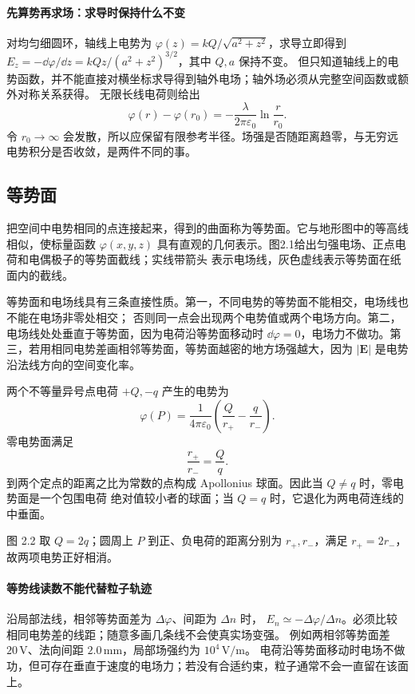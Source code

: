 \paragraph{先算势再求场：求导时保持什么不变}
对均匀细圆环，轴线上电势为 $\varphi(z)=kQ/\sqrt{a^2+z^2}$，求导立即得到
$E_z=-\dd\varphi/\dd z=kQz/(a^2+z^2)^{3/2}$，其中 $Q,a$ 保持不变。
但只知道轴线上的电势函数，并不能直接对横坐标求导得到轴外电场；轴外场必须从完整空间函数或额外对称关系获得。
无限长线电荷则给出
\[
 \varphi(r)-\varphi(r_0)=-\frac{\lambda}{2\pi\varepsilon_0}\ln\frac r{r_0}.
\]
令 $r_0\to\infty$ 会发散，所以应保留有限参考半径。场强是否随距离趋零，与无穷远电势积分是否收敛，是两件不同的事。

\subsection*{等势面}

把空间中电势相同的点连接起来，得到的曲面称为等势面。它与地形图中的等高线相似，使标量函数
$\varphi(x,y,z)$ 具有直观的几何表示。图2.1给出匀强电场、正点电荷和电偶极子的等势面截线；实线带箭头
表示电场线，灰色虚线表示等势面在纸面内的截线。

\equipotentialGallery
{}

等势面和电场线具有三条直接性质。第一，不同电势的等势面不能相交，电场线也不能在电场非零处相交；
否则同一点会出现两个电势值或两个电场方向。第二，电场线处处垂直于等势面，因为电荷沿等势面移动时
$\dd\varphi=0$，电场力不做功。第三，若用相同电势差画相邻等势面，等势面越密的地方场强越大，因为
$|\boldsymbol E|$ 是电势沿法线方向的空间变化率。

两个不等量异号点电荷 $+Q,-q$ 产生的电势为
\[
  \varphi(P)=\frac{1}{4\pi\varepsilon_0}
  \left(\frac{Q}{r_+}-\frac{q}{r_-}\right).
\]
零电势面满足
\[
  \frac{r_+}{r_-}=\frac{Q}{q}.
\]
到两个定点的距离之比为常数的点构成 Apollonius 球面。因此当 $Q\ne q$ 时，零电势面是一个包围电荷
绝对值较小者的球面；当 $Q=q$ 时，它退化为两电荷连线的中垂面。

图 2.2 取 $Q=2q$；圆周上 $P$ 到正、负电荷的距离分别为 $r_+,r_-$，满足 $r_+=2r_-$，故两项电势正好相消。

\zeroEquipotentialFigure
{}


\paragraph{等势线读数不能代替粒子轨迹}
沿局部法线，相邻等势面差为 $\Delta\varphi$、间距为 $\Delta n$ 时，
$E_n\simeq-\Delta\varphi/\Delta n$。必须比较相同电势差的线距；随意多画几条线不会使真实场变强。
例如两相邻等势面差 $20\,\mathrm V$、法向间距 $2.0\,\mathrm{mm}$，局部场强约为 $10^4\,\mathrm{V/m}$。
电荷沿等势面移动时电场不做功，但可存在垂直于速度的电场力；若没有合适约束，粒子通常不会一直留在该面上。

